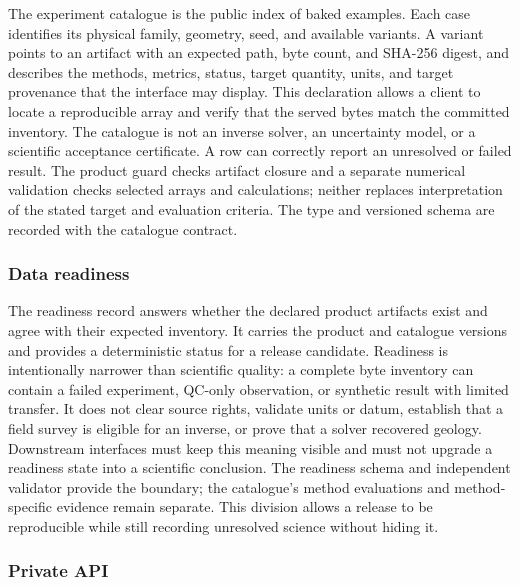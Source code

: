 The experiment catalogue is the public index of baked examples. Each
case identifies its physical family, geometry, seed, and available
variants. A variant points to an artifact with an expected path, byte
count, and SHA-256 digest, and describes the methods, metrics, status,
target quantity, units, and target provenance that the interface may
display. This declaration allows a client to locate a reproducible
array and verify that the served bytes match the committed inventory.
The catalogue is not an inverse solver, an uncertainty model, or a
scientific acceptance certificate. A row can correctly report an
unresolved or failed result. The product guard checks artifact closure
and a separate numerical validation checks selected arrays and
calculations; neither replaces interpretation of the stated target and
evaluation criteria. The type and versioned schema are recorded with
the catalogue contract.

\subsubsection{Data readiness}\label{contract-readiness}

The readiness record answers whether the declared product artifacts
exist and agree with their expected inventory. It carries the product
and catalogue versions and provides a deterministic status for a
release candidate. Readiness is intentionally narrower than scientific
quality: a complete byte inventory can contain a failed experiment,
QC-only observation, or synthetic result with limited transfer. It
does not clear source rights, validate units or datum, establish that a
field survey is eligible for an inverse, or prove that a solver recovered
geology. Downstream interfaces must keep this meaning visible and must
not upgrade a readiness state into a scientific conclusion. The readiness
schema and independent validator provide the boundary; the catalogue's
method evaluations and method-specific evidence remain separate. This
division allows a release to be reproducible while still recording
unresolved science without hiding it.

\subsubsection{Private API}\label{contract-private-api}

